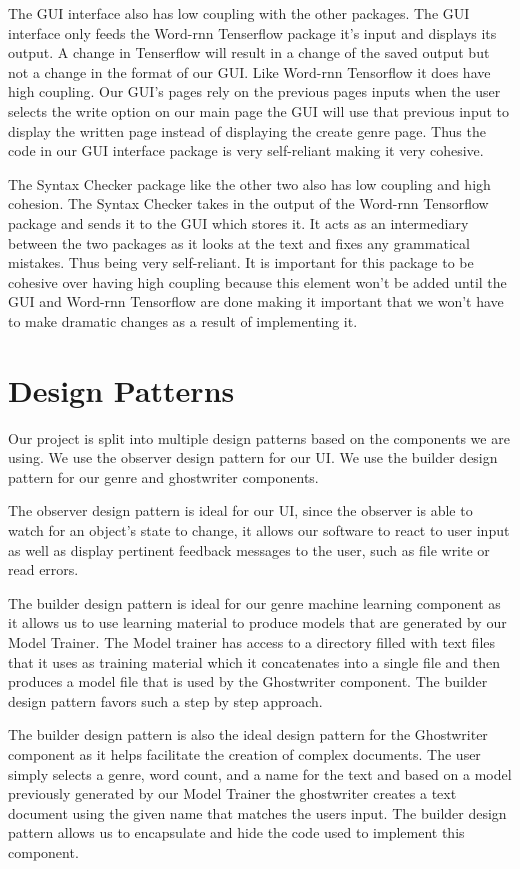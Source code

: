\documentclass[12pt]{article}
\begin{document}
The GUI interface also has low coupling with the other packages. The GUI interface only feeds the Word-rnn Tenserflow package it's input and displays its output. A change in Tenserflow will result in a change of the saved output but not a change in the format of our GUI. Like Word-rnn Tensorflow it does have high coupling. Our GUI's pages rely on the previous pages inputs when the user selects the write option on our main page the GUI will use that previous input to display the written page instead of displaying the create genre page. Thus the code in our GUI interface package is very self-reliant making it very cohesive.

The Syntax Checker package like the other two also has low coupling and high cohesion. The Syntax Checker takes in the output of the Word-rnn Tensorflow package and sends it to the GUI which stores it. It acts as an intermediary between the two packages as it looks at the text and fixes any grammatical mistakes. Thus being very self-reliant. It is important for this package to be cohesive over having high coupling because this element won't be added until the GUI and Word-rnn Tensorflow are done making it important that we won't have to make dramatic changes as a result of implementing it.

\section{Design Patterns}

Our project is split into multiple design patterns based on the components we are using. We use the observer design pattern for our UI. We use the builder design pattern for our genre and ghostwriter components.

The observer design pattern is ideal for our UI, since the observer is able to watch for an object's state to change, it allows our software to react to user input as well as display pertinent feedback messages to the user, such as file write or read errors.

The builder design pattern is ideal for our genre machine learning component as it allows us to use learning material to produce models that are generated by our Model Trainer. The Model trainer has access to a directory filled with text files that it uses as training material which it concatenates into a single file and then produces a model file that is used by the Ghostwriter component. The builder design pattern favors such a step by step approach. 

The builder design pattern is also the ideal design pattern for the Ghostwriter component as it helps facilitate the creation of complex documents. The user simply selects a genre, word count, and a name for the text and based on a model previously generated by our Model Trainer the ghostwriter creates a text document using the given name that matches the users input. The builder design pattern allows us to encapsulate and hide the code used to implement this component. 
\end{document}

